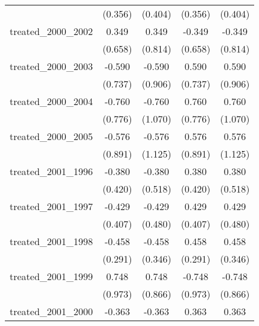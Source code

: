 {\begin{tabular}{l*{4}{c}}
            &     (0.356)         &     (0.404)         &     (0.356)         &     (0.404)         \\
[1em]
treated\_2000\_2002&       0.349         &       0.349         &      -0.349         &      -0.349         \\
            &     (0.658)         &     (0.814)         &     (0.658)         &     (0.814)         \\
[1em]
treated\_2000\_2003&      -0.590         &      -0.590         &       0.590         &       0.590         \\
            &     (0.737)         &     (0.906)         &     (0.737)         &     (0.906)         \\
[1em]
treated\_2000\_2004&      -0.760         &      -0.760         &       0.760         &       0.760         \\
            &     (0.776)         &     (1.070)         &     (0.776)         &     (1.070)         \\
[1em]
treated\_2000\_2005&      -0.576         &      -0.576         &       0.576         &       0.576         \\
            &     (0.891)         &     (1.125)         &     (0.891)         &     (1.125)         \\
[1em]
treated\_2001\_1996&      -0.380         &      -0.380         &       0.380         &       0.380         \\
            &     (0.420)         &     (0.518)         &     (0.420)         &     (0.518)         \\
[1em]
treated\_2001\_1997&      -0.429         &      -0.429         &       0.429         &       0.429         \\
            &     (0.407)         &     (0.480)         &     (0.407)         &     (0.480)         \\
[1em]
treated\_2001\_1998&      -0.458         &      -0.458         &       0.458         &       0.458         \\
            &     (0.291)         &     (0.346)         &     (0.291)         &     (0.346)         \\
[1em]
treated\_2001\_1999&       0.748         &       0.748         &      -0.748         &      -0.748         \\
            &     (0.973)         &     (0.866)         &     (0.973)         &     (0.866)         \\
[1em]
treated\_2001\_2000&      -0.363\sym{*}  &      -0.363\sym{**} &       0.363\sym{*}  &       0.363\sym{**} \\

\end{tabular}}
